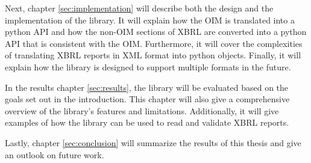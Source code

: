Next, chapter \ref{sec:implementation} will describe both the design and the implementation of the library.
It will explain how the OIM is translated into a python API and how the non-OIM sections of XBRL are converted into a python API that is consistent with the OIM.
Furthermore, it will cover the complexities of translating XBRL reports in XML format into python objects.
Finally, it will explain how the library is designed to support multiple formats in the future.

In the results chapter \ref{sec:results}, the library will be evaluated based on the goals set out in the introduction.
This chapter will also give a comprehensive overview of the library's features and limitations.
Additionally, it will give examples of how the library can be used to read and validate XBRL reports.

Lastly, chapter \ref{sec:conclusion} will summarize the results of this thesis and give an outlook on future work.
